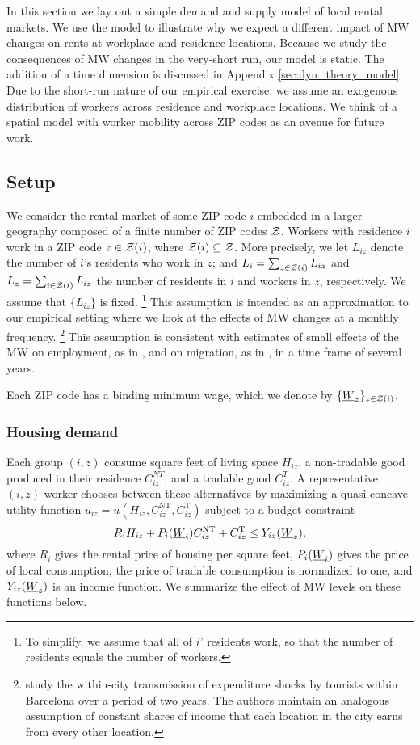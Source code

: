 
In this section we lay out a simple demand and supply model of local rental markets.
We use the model to illustrate why we expect a different impact of MW changes 
on rents at workplace and residence locations.
Because we study the consequences of MW changes in the very-short run, our model 
is static.
The addition of a time dimension is discussed in Appendix 
\ref{sec:dyn_theory_model}.
Due to the short-run nature of our empirical exercise, we assume an exogenous 
distribution of workers across residence and workplace locations.
We think of a spatial model with worker mobility across ZIP codes as an avenue 
for future work.

\subsection{Setup}

We consider the rental market of some ZIP code $i$ embedded in a larger geography 
composed of a finite number of ZIP codes $\mathcal{Z}$.
Workers with residence $i$ work in a ZIP code $z\in\mathcal{Z}(i)$, where 
$\mathcal{Z}(i)\subseteq\mathcal{Z}$.
More precisely, we let $L_{iz}$ denote the number of $i$'s residents who work 
in $z$; and 
$L_i = \sum_{z \in \mathcal{Z}(i)} L_{iz}$ and $L_z = \sum_{i \in \mathcal{Z}(i)} L_{iz}$ the 
number of residents in $i$ and workers in $z$, respectively.
We assume that $\{L_{iz}\}$ is fixed.%
\footnote{To simplify, we assume that all of $i$' residents work, so that the 
number of residents equals the number of workers.}
This assumption is intended as an approximation to our empirical setting where 
we look at the effects of MW changes at a monthly frequency.%
\footnote{\textcite{AllenEtAl2020} study the within-city transmission of 
expenditure shocks by tourists within Barcelona over a period of two years.
The authors maintain an analogous assumption of constant shares of income that
each location in the city earns from every other location.}
This assumption is consistent with estimates of small effects of the MW on 
employment, as in \textcite{CegnizEtAl2019, DustmannEtAl2022}, and 
on migration, as in \textcite{PerezPerez2021}, 
in a time frame of several years.

Each ZIP code has a binding minimum wage, which we denote by 
$\{\underline{W}_z\}_{z\in\mathcal{Z}(i)}$.

\subsubsection*{Housing demand}

Each group $(i,z)$ consume
square feet of living space $H_{iz}$, 
a non-tradable good produced in their residence $C_{iz}^{NT}$, and
a tradable good $C_{iz}^T$.
A representative $(i,z)$ worker chooses between these alternatives by maximizing
a quasi-concave utility function 
$u_{iz} = u \left(H_{iz}, C^{\text{NT}}_{iz}, C^{\text{T}}_{iz}\right)$
subject to a budget constraint
$$R_i H_{iz} + P_i(\underline{W}_i) C^{\text{NT}}_{iz} + C^{\text{T}}_{iz} \leq Y_{iz}(\underline{W}_z),$$
where
$R_i$ gives the rental price of housing per square feet,
$P_i(\underline{W}_i)$ gives the price of local consumption,
the price of tradable consumption is normalized to one, and 
$Y_{iz}(\underline{W}_z)$ is an income function.
We summarize the effect of MW levels on these functions below.

